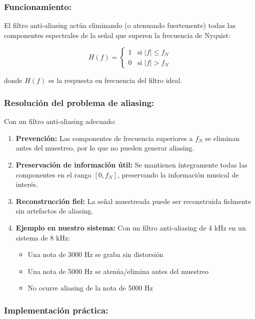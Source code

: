 \documentclass[12pt]{article}
\begin{document}
\subsubsection*{Funcionamiento:}
 
El filtro anti-aliasing actúa eliminando (o atenuando fuertemente) todas las componentes espectrales de la señal que superen la frecuencia de Nyquist:
 
\[
H(f) = \begin{cases}
1 & \text{si } |f| \leq f_N \\
0 & \text{si } |f| > f_N
\end{cases}
\]
 
donde \(H(f)\) es la respuesta en frecuencia del filtro ideal.
 
\subsubsection*{Resolución del problema de aliasing:}
 
Con un filtro anti-aliasing adecuado:
 
\begin{enumerate}
    \item \textbf{Prevención:} Las componentes de frecuencia superiores a \(f_N\) se eliminan antes del muestreo, por lo que no pueden generar aliasing.
    
    \item \textbf{Preservación de información útil:} Se mantienen íntegramente todas las componentes en el rango \([0, f_N]\), preservando la información musical de interés.
    
    \item \textbf{Reconstrucción fiel:} La señal muestreada puede ser reconstruida fielmente sin artefactos de aliasing.
    
    \item \textbf{Ejemplo en nuestro sistema:} Con un filtro anti-aliasing de 4 kHz en un sistema de 8 kHz:
    \begin{itemize}
        \item Una nota de 3000 Hz se graba sin distorsión
        \item Una nota de 5000 Hz se atenúa/elimina antes del muestreo
        \item No ocurre aliasing de la nota de 5000 Hz
    \end{itemize}
\end{enumerate}
 
\subsubsection*{Implementación práctica:}
 
\end{document}
